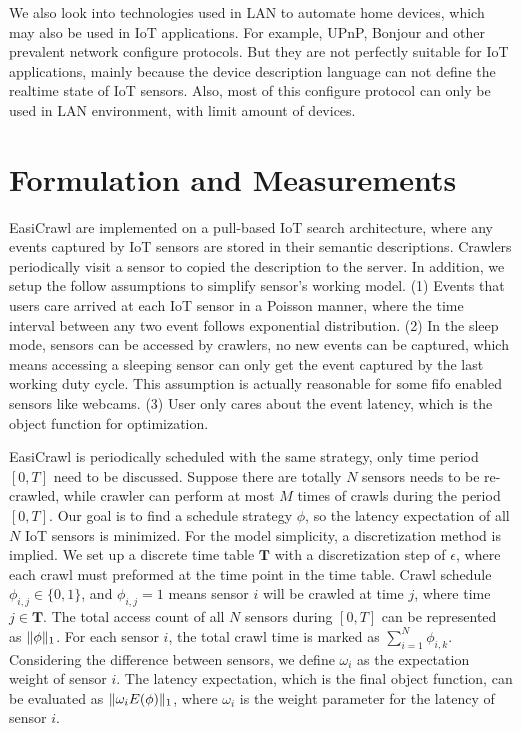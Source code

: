 \documentclass[conference]{IEEEtran}
\begin{document}
We also look into technologies used in LAN to automate home devices, which may also be used in IoT applications. For example, UPnP\cite{UPnP}, Bonjour\cite{Bonjour} and other prevalent network configure protocols. But they are not perfectly suitable for IoT applications, mainly because the device description language can not define the realtime state of IoT sensors. Also, most of this configure protocol can only be used in LAN environment, with limit amount of devices.

\section{Formulation and Measurements}
EasiCrawl are implemented on a pull-based IoT search architecture, where any events captured by IoT sensors are stored in their semantic descriptions. Crawlers periodically visit a sensor to copied the description to the server.
In addition, we setup the follow assumptions to simplify sensor's working model. 
(1) Events that users care arrived at each IoT sensor in a Poisson manner, where the time interval between any two event follows exponential distribution. 
(2) In the sleep mode, sensors can be accessed by crawlers, no new events can be captured, which means accessing a sleeping sensor can only get the event captured by the last working duty cycle. This assumption is actually reasonable for some fifo enabled sensors like webcams. 
(3) User only cares about the event latency, which is the object function for optimization.


EasiCrawl is periodically scheduled with the same strategy, only time period $[0, T]$ need to be discussed.
Suppose there are totally $N$ sensors needs to be re-crawled, while crawler can perform at most $M$ times of crawls during the period $[0, T]$. Our goal is to find a schedule strategy $\phi$, so the latency expectation of all $N$ IoT sensors is minimized. 
For the model simplicity, a discretization method is implied. We set up a discrete time table $\mathbf{T}$ with a discretization step of $\epsilon$, where each crawl must preformed at the time point in the time table.
Crawl schedule $\phi_{i,j}\in\{0,1\}$, and $\phi_{i,j}=1$ means sensor $i$ will be crawled at time $j$, where time $j\in\mathbf{T}$.
The total access count of all $N$ sensors during $[0, T]$ can be represented as $\Arrowvert\phi\Arrowvert_{1}$. For each sensor $i$, the total crawl time is marked as $\sum_{i=1}^{N}\phi_{i,k}$. 
Considering the difference between sensors, we define $\omega_i$ as the expectation weight of sensor $i$. The latency expectation, which is the final object function, can be evaluated as $\Arrowvert \omega_i E(\phi) \Arrowvert_{1}$, where $\omega_i$ is the weight parameter for the latency of sensor $i$.
\end{document}
